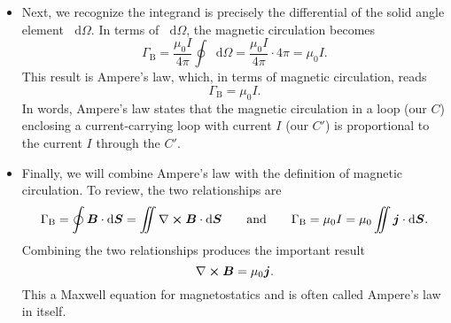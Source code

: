 \documentclass[11pt, a4paper]{article}
\newcommand{\diff}{\mathop{}\!\mathrm{d}} %
\newcommand{\eqtext}[1]{\qquad \text{#1} \qquad}
\renewcommand{\vec}[1]{\bm{#1}} %
\newcommand{\B}{\vec{B}} %
\newcommand{\mm}{\mu_{0}}  %
\renewcommand{\j}{\vec{j}}  %
\renewcommand{\curl}{\nabla \cross}
\begin{document}
\begin{itemize}
    \item Next, we recognize the integrand is precisely the differential of the solid angle element $ \diff \Omega $. In terms of $ \diff \Omega $, the magnetic circulation becomes
	\begin{equation*}
		\Gamma_{\text{B}} = \frac{\mm I}{4\pi} \oint \diff \Omega =  \frac{\mm I}{4\pi}  \cdot 4 \pi = \mm I.
	\end{equation*}
	This result is Ampere's law, which, in terms of magnetic circulation, reads
	\begin{equation*}
		\Gamma_{\text{B}} = \mm I.
	\end{equation*}
    In words, Ampere's law states that the magnetic circulation in a loop (our $ C $) enclosing a current-carrying loop with current $ I $ (our $ C' $) is proportional to the current $ I $ through the $ C' $.
	
	\item Finally, we will combine Ampere's law with the definition of magnetic circulation. To review, the two relationships are
	\begin{equation*}
		\Gamma_{\text{B}} = \oint \B \cdot \diff \vec{S} = \iint \curl \B \cdot \diff \vec{S} \eqtext{and} \Gamma_{\text{B}} = \mm I = \mm \iint \j \cdot \diff \vec{S}.
	\end{equation*}
    Combining the two relationships produces the important result
	\begin{equation*}
		\curl \B = \mm \j.
	\end{equation*}
	This a Maxwell equation for magnetostatics and is often called Ampere's law in itself.
	
\end{itemize}
\end{document}
